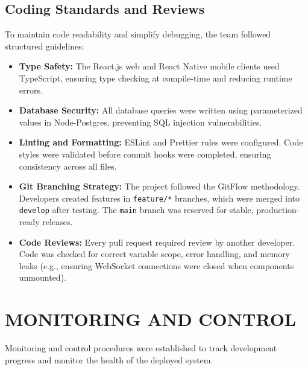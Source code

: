 \documentclass[12,Times new Roman,a4paper]{report}
\begin{document}
\subsection{Coding Standards and Reviews}
To maintain code readability and simplify debugging, the team followed structured guidelines:
\begin{itemize}
    \item \textbf{Type Safety:} The React.js web and React Native mobile clients used TypeScript, ensuring type checking at compile-time and reducing runtime errors.
    \item \textbf{Database Security:} All database queries were written using parameterized values in Node-Postgres, preventing SQL injection vulnerabilities.
    \item \textbf{Linting and Formatting:} ESLint and Prettier rules were configured. Code styles were validated before commit hooks were completed, ensuring consistency across all files.
    \item \textbf{Git Branching Strategy:} The project followed the GitFlow methodology. Developers created features in \texttt{feature/*} branches, which were merged into \texttt{develop} after testing. The \texttt{main} branch was reserved for stable, production-ready releases.
    \item \textbf{Code Reviews:} Every pull request required review by another developer. Code was checked for correct variable scope, error handling, and memory leaks (e.g., ensuring WebSocket connections were closed when components unmounted).
\end{itemize}

\section{MONITORING AND CONTROL}
Monitoring and control procedures were established to track development progress and monitor the health of the deployed system.
\end{document}
